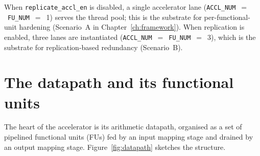 When \texttt{replicate\_accl\_en} is disabled, a single accelerator lane
(\texttt{ACCL\_NUM}~$=$~\texttt{FU\_NUM}~$=$~1) serves the thread pool; this is
the substrate for per-functional-unit hardening (Scenario~A in
Chapter~\ref{ch:framework}). When replication is enabled, three lanes are
instantiated (\texttt{ACCL\_NUM}~$=$~\texttt{FU\_NUM}~$=$~3), which is the
substrate for replication-based redundancy (Scenario~B).

\section{The datapath and its functional units}
\label{sec:arch-datapath}

The heart of the accelerator is its arithmetic datapath, organised as a set of
pipelined functional units (FUs) fed by an input mapping stage and drained by an
output mapping stage. Figure~\ref{fig:datapath} sketches the structure.

